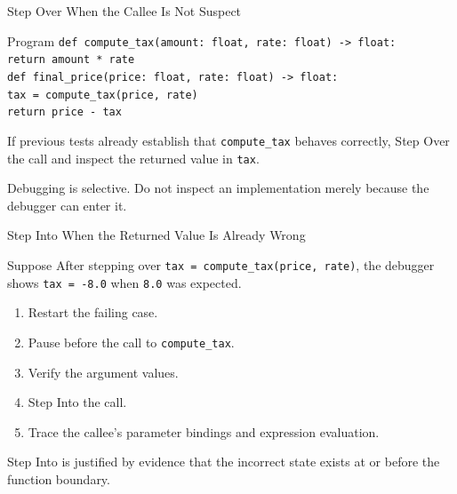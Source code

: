 \documentclass[aspectratio=169,10pt]{beamer}
\begin{document}
\begin{frame}{Step Over When the Callee Is Not Suspect}
  \begin{block}{Program}
    \texttt{def compute\_tax(amount: float, rate: float) -> float:}\\
    \hspace*{0.20in}\texttt{return amount * rate}\\[0.08in]
    \texttt{def final\_price(price: float, rate: float) -> float:}\\
    \hspace*{0.20in}\texttt{tax = compute\_tax(price, rate)}\\
    \hspace*{0.20in}\texttt{return price - tax}
  \end{block}

  If previous tests already establish that \texttt{compute\_tax} behaves correctly, Step Over the call and inspect the returned value in \texttt{tax}.

  \begin{keyidea}
    Debugging is selective. Do not inspect an implementation merely because the debugger can enter it.
  \end{keyidea}
\end{frame}

\begin{frame}{Step Into When the Returned Value Is Already Wrong}
  \begin{block}{Suppose}
    After stepping over \texttt{tax = compute\_tax(price, rate)}, the debugger shows \texttt{tax = -8.0} when \texttt{8.0} was expected.
  \end{block}

  \begin{enumerate}
    \item Restart the failing case.
    \item Pause before the call to \texttt{compute\_tax}.
    \item Verify the argument values.
    \item Step Into the call.
    \item Trace the callee's parameter bindings and expression evaluation.
  \end{enumerate}

  \begin{keyidea}
    Step Into is justified by evidence that the incorrect state exists at or before the function boundary.
  \end{keyidea}
\end{frame}
\end{document}
